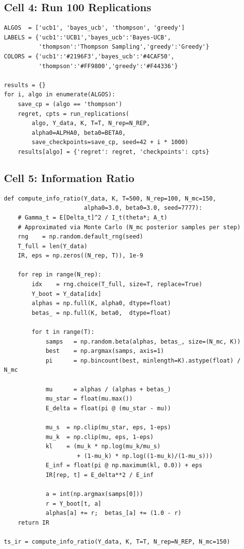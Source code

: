 \documentclass[11pt, letterpaper]{article}
\begin{document}
\subsection*{Cell 4: Run 100 Replications}
\begin{lstlisting}
ALGOS  = ['ucb1', 'bayes_ucb', 'thompson', 'greedy']
LABELS = {'ucb1':'UCB1','bayes_ucb':'Bayes-UCB',
          'thompson':'Thompson Sampling','greedy':'Greedy'}
COLORS = {'ucb1':'#2196F3','bayes_ucb':'#4CAF50',
          'thompson':'#FF9800','greedy':'#F44336'}

results = {}
for i, algo in enumerate(ALGOS):
    save_cp = (algo == 'thompson')
    regret, cpts = run_replications(
        algo, Y_data, K, T=T, N_rep=N_REP,
        alpha0=ALPHA0, beta0=BETA0,
        save_checkpoints=save_cp, seed=42 + i * 1000)
    results[algo] = {'regret': regret, 'checkpoints': cpts}
\end{lstlisting}

\subsection*{Cell 5: Information Ratio}
\begin{lstlisting}
def compute_info_ratio(Y_data, K, T=500, N_rep=100, N_mc=150,
                       alpha0=3.0, beta0=3.0, seed=7777):
    # Gamma_t = E[Delta_t]^2 / I_t(theta*; A_t)
    # Approximated via Monte Carlo (N_mc posterior samples per step)
    rng    = np.random.default_rng(seed)
    T_full = len(Y_data)
    IR, eps = np.zeros((N_rep, T)), 1e-9

    for rep in range(N_rep):
        idx    = rng.choice(T_full, size=T, replace=True)
        Y_boot = Y_data[idx]
        alphas = np.full(K, alpha0, dtype=float)
        betas_ = np.full(K, beta0,  dtype=float)

        for t in range(T):
            samps   = np.random.beta(alphas, betas_, size=(N_mc, K))
            best    = np.argmax(samps, axis=1)
            pi      = np.bincount(best, minlength=K).astype(float) / N_mc

            mu      = alphas / (alphas + betas_)
            mu_star = float(mu.max())
            E_delta = float(pi @ (mu_star - mu))

            mu_s  = np.clip(mu_star, eps, 1-eps)
            mu_k  = np.clip(mu, eps, 1-eps)
            kl    = (mu_k * np.log(mu_k/mu_s)
                     + (1-mu_k) * np.log((1-mu_k)/(1-mu_s)))
            E_inf = float(pi @ np.maximum(kl, 0.0)) + eps
            IR[rep, t] = E_delta**2 / E_inf

            a = int(np.argmax(samps[0]))
            r = Y_boot[t, a]
            alphas[a] += r;  betas_[a] += (1.0 - r)
    return IR

ts_ir = compute_info_ratio(Y_data, K, T=T, N_rep=N_REP, N_mc=150)
\end{lstlisting}
\end{document}
